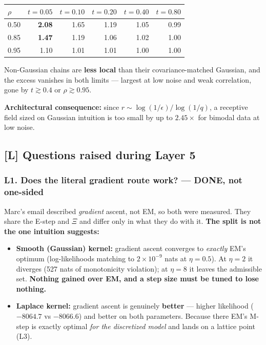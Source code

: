 \documentclass[11pt,a4paper]{article}
\newcommand{\done}{\textcolor{GoodGreen}{\textbf{DONE}}}
\begin{document}
\begin{center}
\begin{tabular}{@{}lrrrrr@{}}
\toprule
$\rho$ & $t=0.05$ & $t=0.10$ & $t=0.20$ & $t=0.40$ & $t=0.80$ \\
\midrule
0.50 & \textbf{2.08} & 1.65 & 1.19 & 1.05 & 0.99 \\
0.85 & \textbf{1.47} & 1.19 & 1.06 & 1.02 & 1.00 \\
0.95 & 1.10 & 1.01 & 1.01 & 1.00 & 1.00 \\
\bottomrule
\end{tabular}
\end{center}

\noindent
Non-Gaussian chains are \textbf{less local} than their covariance-matched Gaussian, and the
excess vanishes in both limits --- largest at low noise and weak correlation, gone by
$t\gtrsim 0.4$ or $\rho\gtrsim 0.95$.

\textbf{Architectural consequence:} since $r \sim \log(1/\epsilon)/\log(1/q)$, a receptive
field sized on Gaussian intuition is too small by up to $\mathbf{2.45\times}$ for bimodal
data at low noise.

\subsection{[L] Questions raised during Layer 5}

\subsubsection*{L1. Does the literal gradient route work? --- \done, not one-sided}

Marc's email described \emph{gradient} ascent, not EM, so both were measured. They share the
E-step and $\Xi$ and differ only in what they do with it. \textbf{The split is not the one
intuition suggests:}

\begin{itemize}
\item \textbf{Smooth (Gaussian) kernel:} gradient ascent converges to \emph{exactly} EM's
optimum (log-likelihoods matching to $2\times10^{-9}$ nats at $\eta=0.5$). At $\eta=2$ it
diverges (527 nats of monotonicity violation); at $\eta=8$ it leaves the admissible set.
\textbf{Nothing gained over EM, and a step size must be tuned to lose nothing.}
\item \textbf{Laplace kernel:} gradient ascent is genuinely \textbf{better} --- higher
likelihood ($-8064.7$ vs $-8066.6$) and better on both parameters. Because there EM's M-step
is exactly optimal \emph{for the discretized model} and lands on a lattice point (L3).
\end{itemize}
\end{document}
